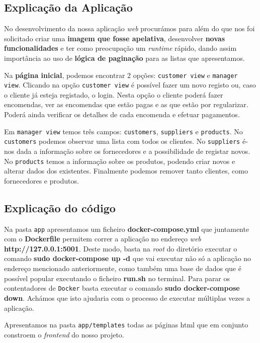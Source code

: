 \documentclass[12pt,a4paper]{article}
\begin{document}
\subsection*{Explicação da Aplicação}

No desenvolvimento da nossa aplicação \textit{web} procurámos para além do que nos foi solicitado criar uma \textbf{imagem que fosse apelativa}, desenvolver
\textbf{novas funcionalidades} e ter como preocupação um \textit{runtime} rápido, dando assim importância ao uso de \textbf{lógica de paginação} para as listas que apresentamos.

Na \textbf{página inicial}, podemos encontrar 2 opções: \texttt{customer view} e \texttt{manager view}.
Clicando na opção \texttt{customer view} é possível fazer um novo registo ou, caso o cliente já esteja registado, o login.
Nesta opção o cliente poderá fazer encomendas, ver as encomendas que estão pagas e as que estão por regularizar.
Poderá ainda verificar os detalhes de cada encomenda e efetuar pagamentos.

Em \texttt{manager view} temos três campos: \texttt{customers}, \texttt{suppliers} e \texttt{products}.
No \texttt{customers} podemos observar uma lista com todos os clientes.
No \texttt{suppliers} é-nos dada a informação sobre os fornecedores e a possibilidade de registar novos.
No \texttt{products} temos a informação sobre os produtos, podendo criar novos e alterar dados dos existentes.
Finalmente podemos remover tanto clientes, como fornecedores e produtos.

\subsection*{Explicação do código}

Na pasta \texttt{app} apresentamos um ficheiro \textbf{docker-compose.yml} que juntamente
com o \textbf{Dockerfile} permitem correr a aplicação no endereço \textit{web} \textbf{http://127.0.0.1:5001}.
Deste modo, basta na \textit{root} do diretório executar o comando \textbf{sudo docker-compose up -d}
que vai executar não só a aplicação no endereço mencionado anteriormente, como também uma base de dados
que é possível popular executando o ficheiro \textbf{run.sh} no terminal. Para parar os contentadores de \texttt{Docker}
basta executar o comando \textbf{sudo docker-compose down}. Achámos que isto ajudaria com o processo
de executar múltiplas vezes a aplicação.

Apresentamos na pasta \texttt{app/templates} todas as páginas html que em conjunto constroem o \textit{frontend}
do nosso projeto.
\end{document}
